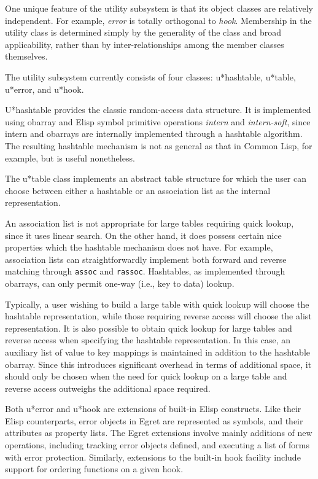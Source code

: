 One unique feature of the utility subsystem is that its object classes are
relatively independent. For example, {\it error \/} is totally orthogonal to {\it
hook\/}.   Membership in the utility class is determined simply by the
generality of the class and broad  applicability, rather than by
inter-relationships among the member classes themselves.

The utility subsystem currently consists of four classes: {\sf
u*hashtable}, {\sf u*table}, {\sf u*error}, and {\sf u*hook}. 

{\sf U*hashtable} provides the classic random-access data structure. It is
implemented using obarray and Elisp symbol primitive operations {\it
intern\/} and {\it intern-soft\/}, since intern and obarrays are internally
implemented through a hashtable algorithm.  The resulting hashtable
mechanism is not as general as that in Common Lisp, for example, but is useful
nonetheless.





The {\sf u*table} class implements an abstract table structure
for which the user can choose between either a hashtable or 
an association list as the internal representation.

An association list is not appropriate for  large tables requiring quick lookup,
since it uses linear search. On the other hand, it does possess certain nice
properties which the hashtable mechanism does not have.  For example,
association lists can straightforwardly implement both forward and reverse
matching  through {\tt assoc} and  {\tt rassoc}. Hashtables, as implemented
through obarrays, can only permit one-way (i.e., key to data) lookup.

Typically, a user wishing to build a large table with quick lookup will choose
the hashtable representation, while those requiring reverse access will
choose the alist representation.  It is also possible to  obtain quick lookup for
large tables and reverse access when specifying the hashtable
representation.  In this case, an auxiliary list of  value to key mappings is
maintained in addition to the hashtable  obarray.  Since this introduces
significant overhead in terms of additional space, it should only be chosen
when the need for quick lookup on a large table and reverse access outweighs
the additional space required.

Both {\sf u*error} and {\sf u*hook} are extensions of built-in Elisp
constructs. Like their Elisp counterparts, error objects in Egret are
represented as symbols, and their attributes as property lists.  The Egret
extensions  involve mainly additions of new operations, including tracking
error objects defined,  and executing a list of forms with error protection.
Similarly, extensions to the built-in hook facility include support for ordering
functions on a given hook.


